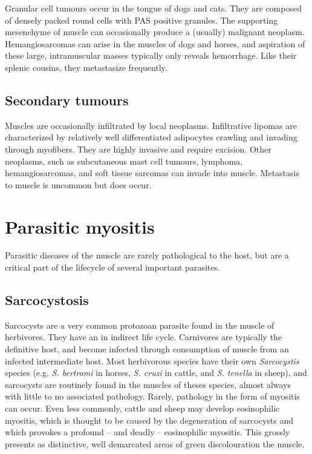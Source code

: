 \documentclass[openany]{book}
\begin{document}
Granular cell tumours occur in the tongue of dogs and cats. They are
composed of densely packed round cells with PAS positive granules. The
supporting mesenchyme of muscle can occasionally produce a (usually)
malignant neoplasm. Hemangiosarcomas can arise in the muscles of dogs
and horses, and aspiration of these large, intramuscular masses
typically only reveals hemorrhage. Like their splenic cousins, they
metastasize frequently.

\section{Secondary tumours}\label{secondary-tumours}

Muscles are occasionally infiltrated by local neoplasms. Infiltrative
lipomas are characterized by relatively well differentiated adipocytes
crawling and invading through myofibers. They are highly invasive and
require excision. Other neoplasms, such as subcutaneous mast cell
tumours, lymphoma, hemangiosarcomas, and soft tissue sarcomas can invade
into muscle. Metastasis to muscle is uncommon but does occur.

\chapter{Parasitic myositis}\label{parasitic-myositis}

Parasitic diseases of the muscle are rarely pathological to the host,
but are a critical part of the lifecycle of several important parasites.

\hypertarget{sarcocystosis}{\section{Sarcocystosis}\label{sarcocystosis}}

Sarcocysts are a very common protozoan parasite found in the muscle of
herbivores. They have an in indirect life cycle. Carnivores are
typically the definitive host, and become infected through consumption
of muscle from an infected intermediate host. Most herbivorous species
have their own \emph{Sarcocystis} species (e.g. \emph{S. bertrami} in
horses, \emph{S. cruzi} in cattle, and \emph{S. tenella} in sheep), and
sarcocysts are routinely found in the muscles of theses species, almost
always with little to no associated pathology. Rarely, pathology in the
form of myositis can occur. Even less commonly, cattle and sheep may
develop eosinophilic myositis, which is thought to be caused by the
degeneration of sarcocysts and which provokes a profound -- and deadly
-- eosinophilic myositis. This grossly presents as distinctive, well
demarcated areas of green discolouration the muscle.
\end{document}
